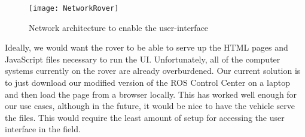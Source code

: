 \begin{figure}[H]
\centerline{\texttt{[image: NetworkRover]}}
\caption[]{Network architecture to enable the user-interface}
\label{fig:NetworkRover}
\end{figure}

Ideally, we would want the rover to be able to serve up the HTML pages and JavaScript files necessary to run the UI.  Unfortunately, all of the computer systems currently on the rover are already overburdened.  Our current solution is to just download our modified version of the ROS Control Center on a laptop and then load the page from a browser locally.  This has worked well enough for our use cases, although in the future, it would be nice to have the vehicle serve the files.  This would require the least amount of setup for accessing the user interface in the field.
